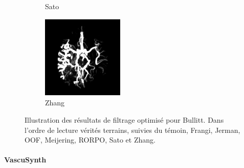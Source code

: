 \begin{figure}[!ht]
\begin{subfigure}[t]{0.32\textwidth}
  \caption{Sato}
  \end{subfigure}
  \begin{subfigure}[t]{0.32\textwidth}
  \includegraphics[clip = true, trim = 90 20 90 20, height=4cm,width=3.9cm]{Images/Bullitt_Zhang.png}
  \caption{Zhang}
  \end{subfigure}
  \centering
  \caption{Illustration des résultats de filtrage optimisé pour Bullitt.
  Dans l'ordre de lecture vérités terrains, suivies du témoin, Frangi, Jerman, OOF, Meijering, RORPO, Sato et Zhang.}
  \label{fig:qualitative results VascuSynth}
\end{figure}

\paragraph{VascuSynth}


